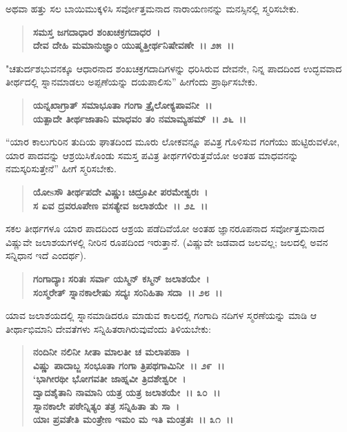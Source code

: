 ಅಥವಾ ಹತ್ತು ಸಲ ಬಾಯಿಮುಕ್ಕಳಿಸಿ ಸರ್ವೋತ್ತಮನಾದ ನಾರಾಯಣನನ್ನು ಮನಸ್ಸಿನಲ್ಲಿ ಸ್ಮರಿಸಬೇಕು.

\begin{verse}
\textbf{ಸಮಸ್ತ ಜಗದಾಧಾರ ಶಂಖಚಕ್ರಗದಾಧರ~।}\\\textbf{ದೇವ ದೇಹಿ ಮಮಾನುಜ್ಞಾಂ ಯುಷ್ಮತ್ತೀರ್ಥನಿಷೇವಣೇ~।। ೨೫~।।}
\end{verse}

"ಚತುರ್ದಶಭುವನಕ್ಕೂ ಆಧಾರನಾದ ಶಂಖಚಕ್ರಗದಾದಿಗಳನ್ನು ಧರಿಸಿರುವ ದೇವನೇ, ನಿನ್ನ ಪಾದದಿಂದ ಉದ್ಭವವಾದ ತೀರ್ಥದಲ್ಲಿ ಸ್ನಾನಮಾಡಲು ಅಪ್ಪಣೆಯನ್ನು ದಯಪಾಲಿಸು” ಹೀಗೆಂದು ಪ್ರಾರ್ಥಿಸಬೇಕು.

\begin{verse}
\textbf{ಯನ್ನಖಾಗ್ರಾತ್ ಸಮಾಭೂತಾ ಗಂಗಾ ತ್ರೈಲೋಕ್ಯಪಾವನೀ~।।}\\\textbf{ಯತ್ಪಾದೇ ತೀರ್ಥಜಾತಾನಿ ಮಾಧವಂ ತಂ ನಮಾಮ್ಯಹಮ್~।। ೨೬~।।}
\end{verse}

“ಯಾರ ಕಾಲುಗುರಿನ ತುದಿಯ ಘಾತದಿಂದ ಮೂರು ಲೋಕವನ್ನೂ ಪವಿತ್ರ ಗೊಳಿಸುವ ಗಂಗೆಯು ಹುಟ್ಟಿರುವಳೋ, ಯಾರ ಪಾದವನ್ನು ಆಶ್ರಯಿಸಿಕೊಂಡು ಸಮಸ್ತ ಪವಿತ್ರ ತೀರ್ಥಗಳಿರುತ್ತವೆಯೋ ಅಂತಹ ಮಾಧವನನ್ನು ನಮಸ್ಕರಿಸುತ್ತೇನೆ” ಹೀಗೆ ಸ್ಮರಿಸಬೇಕು.

\begin{verse}
\textbf{ಯೋsಸೌ ತೀರ್ಥಪದೇ ವಿಷ್ಣುಃ ಚಿದ್ರೂಪೀ ಪರಮೇಶ್ವರಃ~।}\\\textbf{ಸ ಏವ ದ್ರವರೂಪೇಣ ವಸತ್ಯೇವ ಜಲಾಶಯೇ~।। ೨೭~।।}
\end{verse}

ಸಕಲ ತೀರ್ಥಗಳೂ ಯಾರ ಪಾದದಿಂದ ಆಶ್ರಯ ಪಡೆದಿವೆಯೋ ಅಂತಹ ಜ್ಞಾನರೂಪನಾದ ಸರ್ವೋತ್ತಮನಾದ ವಿಷ್ಣುವೇ ಜಲಾಶಯಗಳಲ್ಲಿ ನೀರಿನ ರೂಪದಿಂದ ಇರುತ್ತಾನೆ. (ವಿಷ್ಣುವೇ ಜಡವಾದ ಜಲವಲ್ಲ; ಜಲದಲ್ಲಿ ಅವನ ಸನ್ನಿಧಾನ ಇದೆ ಎಂದರ್ಥ).

\begin{verse}
\textbf{ಗಂಗಾದ್ಯಾಃ ಸರಿತಃ ಸರ್ವಾ ಯಸ್ಮಿನ್ ಕಸ್ಮಿನ್ ಜಲಾಶಯೇ~।}\\\textbf{ಸಂಸ್ಮರೇತ್ ಸ್ನಾನಕಾಲೇಷು ಸದ್ಯಃ ಸಂನಿಹಿತಾ ಸದಾ~।। ೨೮~।।}
\end{verse}

ಯಾವ ಜಲಾಶಯದಲ್ಲಿ ಸ್ನಾನಮಾಡಿದರೂ ಮಾಡುವ ಕಾಲದಲ್ಲಿ ಗಂಗಾದಿ ನದಿಗಳ ಸ್ಮರಣೆಯನ್ನು ಮಾಡಿ ಆ ತೀರ್ಥಾಭಿಮಾನಿ ದೇವತೆಗಳು ಸನ್ನಿಹಿತರಾಗಿರುವುವೆಂದು ತಿಳಿಯಬೇಕು:

\begin{verse}
\textbf{ನಂದಿನೀ ನಲಿನೀ ಸೀತಾ ಮಾಲತೀ ಚ ಮಲಾಪಹಾ~।}\\\textbf{ವಿಷ್ಣು ಪಾದಾಬ್ಜ ಸಂಭೂತಾ ಗಂಗಾ ತ್ರಿಪಥಗಾಮಿನೀ~।। ೨೯~।।}\\\textbf{`ಭಾಗೀರಥೀ ಭೋಗವತೀ ಜಾಹ್ನವೀ ತ್ರಿದಶೇಶ್ವರೀ~।}\\\textbf{ದ್ವಾದಶೈತಾನಿ ನಾಮಾನಿ ಯತ್ರ ಯತ್ರ ಜಲಾಶಯೇ~।। ೩೦~।।}\\\textbf{ಸ್ನಾನಕಾಲೇ ಪಠೇನ್ನಿತ್ಯಂ ತತ್ರ ಸನ್ನಿಹಿತಾ ತು ಸಾ~।}\\\textbf{ಯಾಃ ಪ್ರವತೇತಿ ಮಂತ್ರೇಣ ಇಮಂ ಮ ಇತಿ ಮಂತ್ರತಃ~।। ೩೧~।।}
\end{verse}

